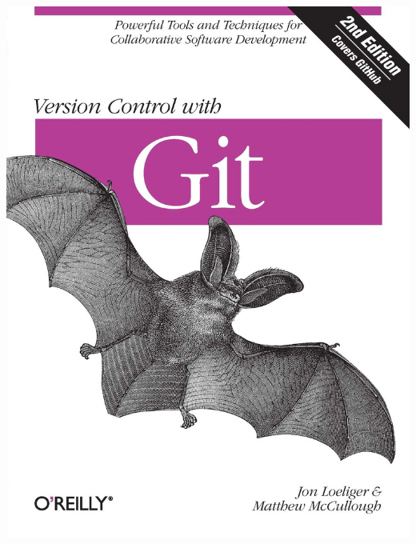 \documentclass[10pt]{beamer}
\begin{document}
\begin{frame}{\subsecname}
    \centerline{\includegraphics[height=0.8\textheight]{img/Version Control with Git.jpg}}
\end{frame}
\end{document}

